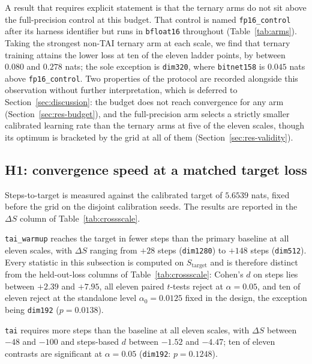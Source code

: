 \documentclass[final,5p,times,twocolumn]{elsarticle}
\theoremstyle{remark}
\newcommand{\dS}{\Delta S}
\begin{document}
A result that requires explicit statement is that the ternary arms do not sit
above the full-precision control at this budget. That control is named
\texttt{fp16\_control} after its harness identifier but runs in
\texttt{bfloat16} throughout (Table~\ref{tab:arms}). Taking the strongest non-TAI
ternary arm at each scale, we find that ternary training attains the lower
loss at ten of the eleven ladder points, by between
$0.080$ and $0.278$ nats; the sole exception is \texttt{dim320}, where
\texttt{bitnet158} is $0.045$ nats above \texttt{fp16\_control}. Two properties
of the protocol are recorded alongside this observation without further
interpretation, which is deferred to Section~\ref{sec:discussion}: the
budget does not reach convergence for any arm (Section~\ref{sec:res-budget}),
and the full-precision arm selects a strictly smaller calibrated learning rate
than the ternary arms at five of the eleven scales, though its optimum is
bracketed by the grid at all of them (Section~\ref{sec:res-validity}).

\subsection{H1: convergence speed at a matched target loss}
\label{sec:res-h1}

Steps-to-target is measured against the calibrated target of $5.6539$ nats,
fixed before the grid on the disjoint calibration seeds. The results are
reported in the $\dS$ column of Table~\ref{tab:crossscale}.

\texttt{tai\_warmup} reaches the target in fewer steps than the primary
baseline at all eleven scales, with $\dS$ ranging from $+28$ steps
(\texttt{dim1280}) to $+148$ steps (\texttt{dim512}). Every statistic in this
subsection is computed on $S_{\mathrm{target}}$ and is therefore distinct from
the held-out-loss columns of Table~\ref{tab:crossscale}: Cohen's $d$ on steps
lies between $+2.39$ and $+7.95$, all eleven paired $t$-tests reject at
$\alpha = 0.05$, and ten of eleven reject at the standalone level
$\alpha_{0} = 0.0125$ fixed in the design, the exception being
\texttt{dim192} ($p = 0.0138$).

\texttt{tai} requires more steps than the baseline at all eleven scales,
with $\dS$ between $-48$ and $-100$ and steps-based $d$ between $-1.52$ and
$-4.47$; ten of eleven contrasts are significant at $\alpha = 0.05$ (\texttt{dim192}:
$p = 0.1248$).
\end{document}
